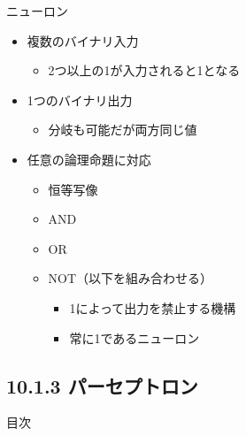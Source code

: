 \documentclass[aspectratio=169, dvipdfmx, 14pt, xcolor={svgnames,dvipsnames}]{beamer}
\def\tightlist{\itemsep1pt\parskip0pt\parsep0pt}
\begin{document}

\begin{frame}{\quad ニューロン}
  \begin{itemize}
    \tightlist
    \item
          複数のバイナリ入力

          \begin{itemize}
            \tightlist
            \item
                  2つ以上の1が入力されると1となる
          \end{itemize}
    \item
          1つのバイナリ出力

          \begin{itemize}
            \tightlist
            \item
                  分岐も可能だが両方同じ値
          \end{itemize}
    \item
          \alert{任意の論理命題に対応}

          \begin{itemize}
            \tightlist
            \item
                  恒等写像
            \item
                  AND
            \item
                  OR
            \item
                  NOT（以下を組み合わせる）

                  \begin{itemize}
                    \tightlist
                    \item
                          1によって出力を禁止する機構
                    \item
                          常に1であるニューロン
                  \end{itemize}
          \end{itemize}
  \end{itemize}
\end{frame}


\hypertarget{ux30d1ux30fcux30bbux30d7ux30c8ux30edux30f3}{%
  \subsection{10.1.3
    パーセプトロン}\label{ux30d1ux30fcux30bbux30d7ux30c8ux30edux30f3}}
\begin{frame}{\quad 目次}
  \tableofcontents[currentsubsection]
\end{frame}
\end{document}
